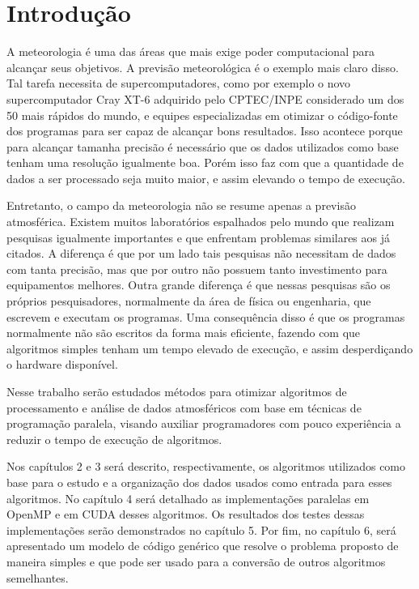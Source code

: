\chapter{Introdução}

A meteorologia é uma das áreas que mais exige poder computacional para alcançar seus objetivos. A previsão meteorológica é o exemplo mais claro disso. Tal tarefa necessita de supercomputadores, como por exemplo o novo supercomputador Cray XT-6 adquirido pelo CPTEC/INPE considerado um dos 50 mais rápidos do mundo, e equipes especializadas em otimizar o código-fonte dos programas para ser capaz de alcançar bons resultados. Isso acontece porque para alcançar tamanha precisão é necessário que os dados utilizados como base tenham uma resolução igualmente boa. Porém isso faz com que a quantidade de dados a ser processado seja muito maior, e assim elevando o tempo de execução.

Entretanto, o campo da meteorologia não se resume apenas a previsão atmosférica. Existem muitos laboratórios espalhados pelo mundo que realizam pesquisas igualmente importantes e que enfrentam problemas similares aos já citados. A diferença é que por um lado tais pesquisas não necessitam de dados com tanta precisão, mas que por outro não possuem tanto investimento para equipamentos melhores. Outra grande diferença é que nessas pesquisas são os próprios pesquisadores, normalmente da área de física ou engenharia, que escrevem e executam os programas. Uma consequência disso é que os programas normalmente não são escritos da forma mais eficiente, fazendo com que algoritmos simples tenham um tempo elevado de execução, e assim desperdiçando o hardware disponível.

Nesse trabalho serão estudados métodos para otimizar algoritmos de processamento e análise de dados atmosféricos com base em técnicas de programação paralela, visando auxiliar programadores com pouco experiência a reduzir o tempo de execução de algoritmos. 

Nos capítulos 2 e 3 será descrito, respectivamente, os algoritmos utilizados como base para o estudo e a organização dos dados usados como entrada para esses algoritmos. No capítulo 4 será detalhado as implementações paralelas em OpenMP e em CUDA desses algoritmos. Os resultados dos testes dessas implementações serão demonstrados no capítulo 5. Por fim, no capítulo 6, será apresentado um modelo de código genérico que resolve o problema proposto de maneira simples e que pode ser usado para a conversão de outros algoritmos semelhantes.